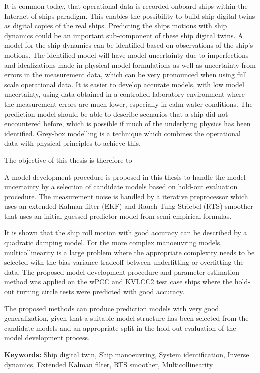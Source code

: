 
It is common today, that operational data is recorded onboard ships within the Internet of ships paradigm. This enables the possibility to build ship digital twins as digital copies of the real ships. Predicting the ships motions with ship dynamics could be an important sub-component of these ship digital twins. A model for the ship dynamics can be identified based on observations of the ship's motions. 
The identified model will have model uncertainty due to imperfections and idealizations made in physical model formulations as well as uncertainty from errors in the measurement data, which can be very pronounced when using full scale operational data. It is easier to develop accurate models, with low model uncertainty, using data obtained in a controlled laboratory environment where the measurement errors are much lower, especially in calm water conditions. The prediction model should be able to describe scenarios that a ship did not encountered before, which is possible if much of the underlying physics has been identified. Grey-box modelling is a technique which combines the operational data with physical principles to achieve this.  
 
The objective of this thesis is therefore to 
\noindent \objective 

A model development procedure is proposed in this thesis to handle the model uncertainty by a selection of candidate models based on hold-out evaluation procedure. The measurement noise is handled by a iterative preprocessor which uses an extended Kalman filter (EKF) and Rauch Tung Striebel (RTS) smoother that uses an initial guessed predictor model from semi-empirical formulas.

It is shown that the ship roll motion with good accuracy can be described by a quadratic damping model. For the more complex manoeuvring models, multicollinearity is a large problem where the appropriate complexity needs to be selected with the bias-variance tradeoff between underfitting or overfitting the data. 
The proposed model development procedure and parameter estimation method was applied on the wPCC and KVLCC2 test case ships where the hold-out turning circle tests were predicted with good accuracy.

The proposed methods can produce prediction models with very good generalization, given that a suitable model structure has been selected from the candidate models and an appropriate split in the hold-out evaluation of the model development process. 

\vspace{0.1cm}
\textbf{Keywords:} Ship digital twin, Ship manoeuvring, System identification, Inverse dynamics, Extended Kalman filter, RTS smoother, Multicollinearity
